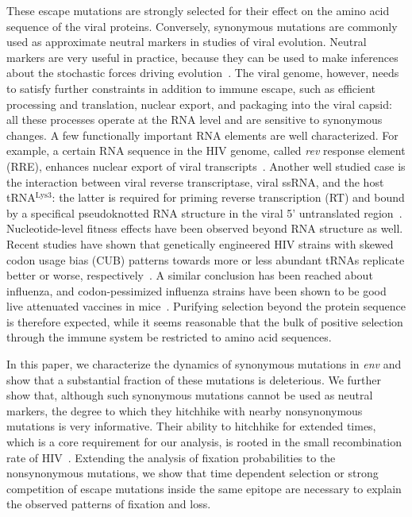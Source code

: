 \documentclass[rmp, twocolumn]{revtex4}
\newcommand{\env}{\textit{env}}
\newcommand{\rev}{\textit{rev}}
\begin{document}
These escape mutations are strongly selected for their effect on the amino acid
sequence of the viral proteins. Conversely, synonymous mutations are commonly
used as approximate neutral markers in studies of viral evolution. Neutral
markers are very useful in practice, because they can be used to make inferences
about the stochastic forces driving evolution~\citep{yang_statistical_2000}.
The viral genome, however, needs to satisfy further constraints in addition to
immune escape, such as efficient processing and translation, nuclear export, and
packaging into the viral capsid: all these processes operate at the RNA level
and are sensitive to synonymous changes. A few functionally important RNA
elements are well characterized. For example, a certain RNA sequence in the HIV
genome, called \rev{} response element (RRE), enhances nuclear export of viral
transcripts~\citep{fernandes_hiv-1_2012}. Another well studied case is the
interaction between viral reverse transcriptase, viral ssRNA, and the host
tRNA$^\text{Lys3}$: the latter is required for priming reverse transcription
(RT) and bound by a specifical pseudoknotted RNA structure in the viral 5'
untranslated region~\citep{barat_interaction_1991, paillart_vitro_2002}.
Nucleotide-level fitness effects have been observed beyond RNA structure as
well. Recent studies have shown that genetically engineered HIV strains with
skewed codon usage bias (CUB) patterns towards more or less abundant tRNAs
replicate better or worse, respectively~\citep{ngumbela_quantitative_2008,
li_codon-usage-based_2012}. A similar conclusion has been reached about
influenza, and codon-pessimized influenza strains have been shown to be good
live attenuated vaccines in mice~\citep{mueller_live_2010}. Purifying selection
beyond the protein sequence is therefore expected, while it seems reasonable
that the bulk of positive selection through the immune system be restricted to
amino acid sequences.


In this paper, we characterize the dynamics of synonymous mutations in \env{}
and show that a substantial fraction of these mutations is deleterious. We
further show that, although such synonymous mutations cannot be used as neutral
markers, the degree to which they hitchhike with nearby nonsynonymous mutations
is very informative. Their ability to hitchhike for extended times, which is a
core requirement for our analysis, is rooted in the small recombination rate of
HIV~\citep{neher_recombination_2010, batorsky_estimate_2011}. Extending the
analysis of fixation probabilities to the nonsynonymous mutations, we show that
time dependent selection or strong competition of escape mutations inside the
same epitope are necessary to explain the observed patterns of fixation and
loss.
\end{document}
